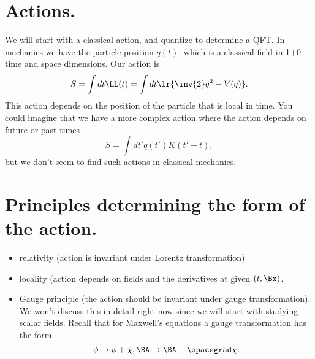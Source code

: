 \section{Actions.}
We will start with a classical action, and quantize to determine a QFT.
In mechanics we have the particle position \( q(t) \), which is a classical field in 1+0 time and space dimensions.  Our action is
\begin{dmath}\label{eqn:qftLecture3:360}
S
= \int dt \LL(t)
= \int dt \lr{
\inv{2} \dot{q}^2 - V(q)
}.
\end{dmath}
This action depends on the position of the particle that is local in time.
You could imagine that we have a more complex action where the action depends on future or past times
\begin{dmath}\label{eqn:qftLecture3:380}
S
= \int dt' q(t') K( t' - t ),
\end{dmath}
but we don't seem to find such actions in classical mechanics.

\section{Principles determining the form of the action.}
\begin{itemize}
\item relativity (action is invariant under Lorentz transformation)
\item locality (action depends on fields and the derivatives at given \((t, \Bx)\).
\item Gauge principle (the action should be invariant under gauge transformation).  We won't discuss this in detail right now since we will start with studying scalar fields.
Recall that for Maxwell's equations a gauge transformation has the form
\begin{dmath}\label{eqn:qftLecture3:520}
\phi \rightarrow \phi + \dot{\chi}, \BA \rightarrow \BA - \spacegrad \chi.
\end{dmath}
\end{itemize}

